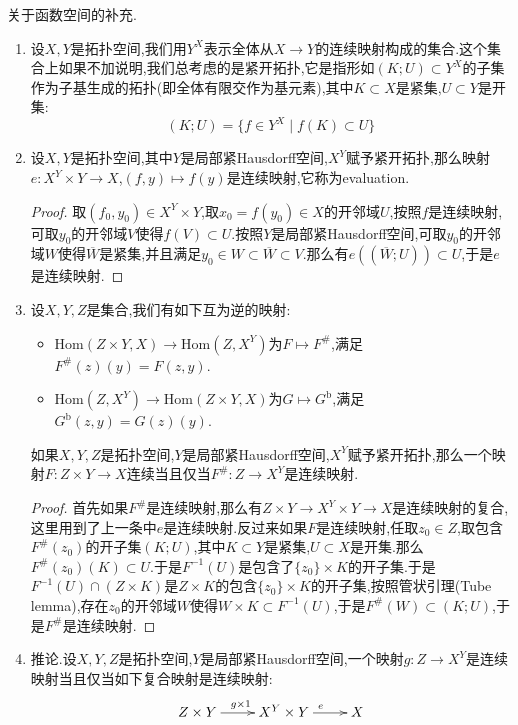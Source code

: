 关于函数空间的补充.
\begin{enumerate}
	\item 设$X,Y$是拓扑空间,我们用$Y^X$表示全体从$X\to Y$的连续映射构成的集合.这个集合上如果不加说明,我们总考虑的是紧开拓扑,它是指形如$(K;U)\subset Y^X$的子集作为子基生成的拓扑(即全体有限交作为基元素),其中$K\subset X$是紧集,$U\subset Y$是开集:
	$$(K;U)=\{f\in Y^X\mid f(K)\subset U\}$$
	\item 设$X,Y$是拓扑空间,其中$Y$是局部紧Hausdorff空间,$X^Y$赋予紧开拓扑,那么映射$e:X^Y\times Y\to X$,$(f,y)\mapsto f(y)$是连续映射,它称为evaluation.
	\begin{proof}
		
		取$(f_0,y_0)\in X^Y\times Y$,取$x_0=f(y_0)\in X$的开邻域$U$,按照$f$是连续映射,可取$y_0$的开邻域$V$使得$f(V)\subset U$.按照$Y$是局部紧Hausdorff空间,可取$y_0$的开邻域$W$使得$\overline{W}$是紧集,并且满足$y_0\in W\subset\overline{W}\subset V$.那么有$e((\overline{W};U))\subset U$,于是$e$是连续映射.
	\end{proof}
	\item 设$X,Y,Z$是集合,我们有如下互为逆的映射:
	\begin{itemize}
		\item $\mathrm{Hom}(Z\times Y,X)\to\mathrm{Hom}(Z,X^Y)$为$F\mapsto F^{\#}$,满足$F^{\#}(z)(y)=F(z,y)$.
		\item $\mathrm{Hom}(Z,X^Y)\to\mathrm{Hom}(Z\times Y,X)$为$G\mapsto G^{\mathrm{b}}$,满足$G^{\mathrm{b}}(z,y)=G(z)(y)$.
	\end{itemize}

    如果$X,Y,Z$是拓扑空间,$Y$是局部紧Hausdorff空间,$X^Y$赋予紧开拓扑,那么一个映射$F:Z\times Y\to X$连续当且仅当$F^{\#}:Z\to X^Y$是连续映射.
    \begin{proof}
    	
    	首先如果$F^{\#}$是连续映射,那么有$Z\times Y\to X^Y\times Y\to X$是连续映射的复合,这里用到了上一条中$e$是连续映射.反过来如果$F$是连续映射,任取$z_0\in Z$,取包含$F^{\#}(z_0)$的开子集$(K;U)$,其中$K\subset Y$是紧集,$U\subset X$是开集.那么$F^{\#}(z_0)(K)\subset U$.于是$F^{-1}(U)$是包含了$\{z_0\}\times K$的开子集.于是$F^{-1}(U)\cap(Z\times K)$是$Z\times K$的包含$\{z_0\}\times K$的开子集,按照管状引理(Tube lemma),存在$z_0$的开邻域$W$使得$W\times K\subset F^{-1}(U)$,于是$F^{\#}(W)\subset(K;U)$,于是$F^{\#}$是连续映射.
    \end{proof}
    \item 推论.设$X,Y,Z$是拓扑空间,$Y$是局部紧Hausdorff空间,一个映射$g:Z\to X^Y$是连续映射当且仅当如下复合映射是连续映射:
    $$\xymatrix{Z\times Y\ar[r]^{g\times1}&X^Y\times Y\ar[r]^e&X}$$
\end{enumerate}

